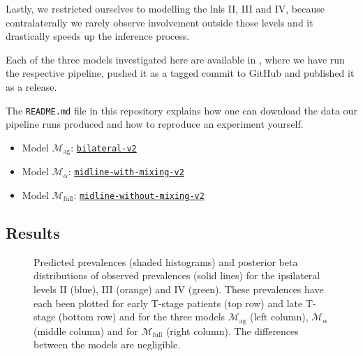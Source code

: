 \documentclass[\relativeRoot/main.tex]{subfiles}
\begin{document}
Lastly, we restricted ourselves to modelling the \glspl{lnl} II, III and IV, because contralaterally we rarely observe involvement outside those levels and it drastically speeds up the inference process.

\begin{tcolorbox}[title=Reproducibility]
    Each of the three models investigated here are available in , where we have run the respective pipeline, pushed it as a tagged commit to GitHub and published it as a release.

    The \texttt{README.md} file in this repository explains how one can download the data our pipeline runs produced and how to reproduce an experiment yourself.

    \begin{itemize}
        \item Model $\mathcal{M}_\text{ag}$: \href{https://github.com/rmnldwg/lynference/releases/tag/bilateral-v2}{\texttt{bilateral-v2}}
        \item Model $\mathcal{M}_\alpha$: \href{https://github.com/rmnldwg/lynference/releases/tag/midline-with-mixing-v2}{\texttt{midline-with-mixing-v2}}
        \item Model $\mathcal{M}_\text{full}$: \href{https://github.com/rmnldwg/lynference/releases/tag/midline-without-mixing-v2}{\texttt{midline-without-mixing-v2}}
    \end{itemize}
\end{tcolorbox}

\subsection*{Results}
\label{subsec:bilateral:model_comp:results}

\begin{figure}
    \def\svgwidth{1.0\textwidth}
    
    \caption{
        Predicted prevalences (shaded histograms) and posterior beta distributions of observed prevalences (solid lines) for the ipsilateral levels II (blue), III (orange) and IV (green). These prevalences have each been plotted for early T-stage patients (top row) and late T-stage (bottom row) and for the three models $\mathcal{M}_\text{ag}$ (left column), $\mathcal{M}_\alpha$ (middle column) and for $\mathcal{M}_\text{full}$ (right column). The differences between the models are negligible.
    }
    \label{fig:bilateral:model_comp:ipsi}
\end{figure}
\end{document}
